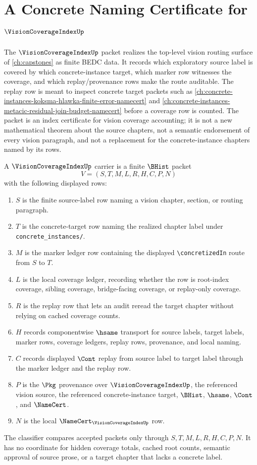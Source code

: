 \chapter{A Concrete Naming Certificate for $\VisionCoverageIndexUp$}
\label{ch:concrete-instances-vision-coverage-index-namecert}

The $\VisionCoverageIndexUp$ packet realizes the top-level vision routing surface of \autoref{ch:capstones} as finite BEDC data. It records which exploratory source label is covered by which concrete-instance target, which marker row witnesses the coverage, and which replay/provenance rows make the route auditable. The replay row is meant to inspect concrete target packets such as \autoref{ch:concrete-instances-koksma-hlawka-finite-error-namecert} and \autoref{ch:concrete-instances-metacic-residual-join-budget-namecert} before a coverage row is counted. The packet is an index certificate for vision coverage accounting; it is not a new mathematical theorem about the source chapters, not a semantic endorsement of every vision paragraph, and not a replacement for the concrete-instance chapters named by its rows.

\begin{definition}
\label{def:vision-coverage-index-carrier}
A $\VisionCoverageIndexUp$ carrier is a finite $\BHist$ packet
$$
V=(S,T,M,L,R,H,C,P,N)
$$
with the following displayed rows:
\begin{enumerate}
\item $S$ is the finite source-label row naming a vision chapter, section, or routing paragraph.
\item $T$ is the concrete-target row naming the realized chapter label under \texttt{concrete\_instances/}.
\item $M$ is the marker ledger row containing the displayed \texttt{\textbackslash concretizedIn} route from $S$ to $T$.
\item $L$ is the local coverage ledger, recording whether the row is root-index coverage, sibling coverage, bridge-facing coverage, or replay-only coverage.
\item $R$ is the replay row that lets an audit reread the target chapter without relying on cached coverage counts.
\item $H$ records componentwise $\hsame$ transport for source labels, target labels, marker rows, coverage ledgers, replay rows, provenance, and local naming.
\item $C$ records displayed $\Cont$ replay from source label to target label through the marker ledger and the replay row.
\item $P$ is the $\Pkg$ provenance over $\VisionCoverageIndexUp$, the referenced vision source, the referenced concrete-instance target, $\BHist$, $\hsame$, $\Cont$, and $\NameCert$.
\item $N$ is the local $\NameCert_{\VisionCoverageIndexUp}$ row.
\end{enumerate}
The classifier compares accepted packets only through $S,T,M,L,R,H,C,P,N$. It has no coordinate for hidden coverage totals, cached root counts, semantic approval of source prose, or a target chapter that lacks a concrete label.
\end{definition}

